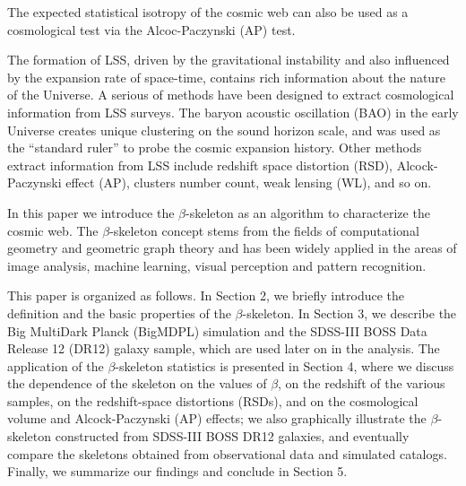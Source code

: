 \documentclass[useAMS,usenatbib]{mnras}
\begin{document}
The expected statistical isotropy of the cosmic web can also be used
as a cosmological test via the Alcoc-Paczynski (AP) test. 

The formation of LSS, driven by the gravitational instability and also influenced by the expansion rate of space-time, 
contains rich information about the nature of the Universe. 
A serious of methods have been designed to extract cosmological information from LSS surveys. 
The baryon acoustic oscillation (BAO) in the early Universe creates unique clustering on the sound horizon scale,
and was used as the ``standard ruler'' to probe the cosmic expansion history. 
Other methods extract information from LSS include redshift space distortion (RSD), Alcock-Paczynski effect (AP), clusters number count, weak lensing (WL), and so on.


In this paper we introduce the $\beta$-skeleton as an algorithm to
characterize the cosmic web. 
The $\beta$-skeleton concept stems from the fields of computational geometry
and geometric graph theory and has been widely applied in the areas of
image analysis, machine learning, visual perception and pattern
recognition. 









This paper is organized as follows. 
In Section 2, we briefly introduce the definition and the basic properties of the $\beta$-skeleton. 
In Section 3, we describe the Big MultiDark Planck (BigMDPL) simulation and the SDSS-III BOSS Data Release 12 (DR12) galaxy sample, which are used later on in the analysis. 
The application of the $\beta$-skeleton statistics is presented in Section 4, 
where we discuss the dependence of the skeleton on the values of $\beta$, 
on the redshift of the various samples, on the redshift-space distortions (RSDs), and on the cosmological volume and Alcock-Paczynski (AP) effects; 
we also graphically illustrate the $\beta$-skeleton constructed from SDSS-III BOSS DR12 galaxies,
and eventually compare the skeletons obtained from observational data and simulated catalogs.  
Finally, we summarize our findings and conclude in Section 5. 


\cite{2017A&A...600A.125C}


 
\end{document}

